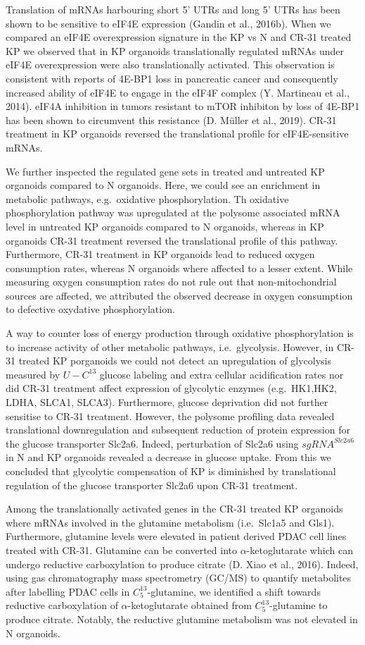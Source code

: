 \documentclass[12pt,openany]{book}
\begin{document}
Translation of mRNAs harbouring short 5' UTRs and long 5' UTRs has been
shown to be sensitive to eIF4E expression (Gandin et al., 2016b). When
we compared an eIF4E overexpression signature in the KP vs N and CR-31
treated KP we observed that in KP organoids translationally regulated
mRNAs under eIF4E overexpression were also translationally activated.
This observation is consistent with reports of 4E-BP1 loss in pancreatic
cancer and consequently increased ability of eIF4E to engage in the
eIF4F complex (Y. Martineau et al., 2014). eIF4A inhibition in tumors
resistant to mTOR inhibiton by loss of 4E-BP1 has been shown to
circumvent this resistance (D. Müller et al., 2019). CR-31 treatment in
KP organoids reversed the translational profile for eIF4E-sensitive
mRNAs.

We further inspected the regulated gene sets in treated and untreated KP
organoids compared to N organoids. Here, we could see an enrichment in
metabolic pathways, e.g.~oxidative phosphorylation. Th oxidative
phosphorylation pathway was upregulated at the polysome associated mRNA
level in untreated KP organoids compared to N organoids, whereas in KP
organoids CR-31 treatment reversed the translational profile of this
pathway. Furthermore, CR-31 treatment in KP organoids lead to reduced
oxygen consumption rates, whereas N organoids where affected to a lesser
extent. While measuring oxygen consumption rates do not rule out that
non-mitochondrial sources are affected, we attributed the observed
decrease in oxygen consumption to defective oxydative phosphorylation.

A way to counter loss of energy production through oxidative
phosphorylation is to increase activity of other metabolic pathways,
i.e.~glycolysis. However, in CR-31 treated KP porganoids we could not
detect an upregulation of glycolysis measured by \(U-C^{13}\) glucose
labeling and extra cellular acidification rates nor did CR-31 treatment
affect expression of glycolytic enzymes (e.g.~HK1,HK2, LDHA, SLCA1,
SLCA3). Furthermore, glucose deprivation did not further sensitise to
CR-31 treatment. However, the polysome profiling data revealed
translational downregulation and subsequent reduction of protein
expression for the glucose transporter Slc2a6. Indeed, perturbation of
Slc2a6 using \(sgRNA^{Slc2a6}\) in N and KP organoids revealed a
decrease in glucose uptake. From this we concluded that glycolytic
compensation of KP is diminished by translational regulation of the
glucose transporter Slc2a6 upon CR-31 treatment.

Among the translationally activated genes in the CR-31 treated KP
organoids where mRNAs involved in the glutamine metabolism (i.e.~Slc1a5
and Gls1). Furthermore, glutamine levels were elevated in patient
derived PDAC cell lines treated with CR-31. Glutamine can be converted
into \(\alpha\)-ketoglutarate which can undergo reductive carboxylation
to produce citrate (D. Xiao et al., 2016). Indeed, using gas
chromatography mass spectrometry (GC/MS) to quantify metabolites after
labelling PDAC cells in \(C_5^{13}\)-glutamine, we identified a shift
towards reductive carboxylation of \(\alpha\)-ketoglutarate obtained
from \(C_5^{13}\)-glutamine to produce citrate. Notably, the reductive
glutamine metabolism was not elevated in N organoids.
\end{document}
